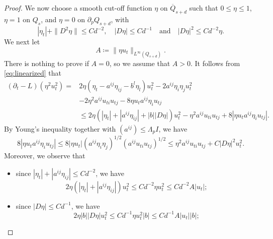 \documentclass[a4paper,11pt]{amsart}
\theoremstyle{plain}
\theoremstyle{definition}
\numberwithin{equation}{section}
\begin{document}
\begin{proof}
We now choose a smooth cut-off function $\eta$ on $\overline{Q}_{s+d}$ such that $0\leq\eta\leq1$, $\eta=1$ on $Q_s$, and $\eta=0$ on $\partial_pQ_{s+d}$, with
\begin{equation*}
    |\eta_t|+\|D^2\eta\|\leq Cd^{-2}, \quad
    |D\eta|\leq Cd^{-1}\quad\text{and}\quad
    |D\eta|^2\leq Cd^{-2}\eta.
\end{equation*}
We next let
\begin{equation*}
 A\coloneqq\|\eta u_t\|_{L^\infty(Q_{s+d})}.
\end{equation*}
There is nothing to prove if $A=0$, so we assume that $A>0$. It follows from \eqref{eq:linearized} that
\begin{equation*}
    \begin{aligned}
        (\partial_t-L)(\eta^2u_t^2)=&2\eta(\eta_t-a^{ij}\eta_{ij}-b^l\eta_l)u_t^2
 -2a^{ij}\eta_i\eta_j u_t^2\\
 &-2\eta^2a^{ij}u_{ti}u_{tj}-8\eta u_ta^{ij}\eta_i u_{tj}\\
 &\leq 2\eta(|\eta_t|+|a^{ij}\eta_{ij}|+|b||D\eta|)u_t^2
 -\eta^2a^{ij}u_{ti}u_{tj}+8|\eta u_ta^{ij}\eta_i u_{tj}|.
    \end{aligned}
\end{equation*}
By Young's inequality together with $(a^{ij}) \leq \Lambda_pI$, we have
\begin{equation*}
 8|\eta u_ta^{ij}\eta_i u_{tj}| \leq 8|\eta u_t|(a^{ij}\eta_i\eta_j)^{1/2}(a^{ij}u_{ti}u_{tj})^{1/2}\leq \eta^2a^{ij}u_{ti}u_{tj}+C|D\eta|^2u_t^2.
\end{equation*}
Moreover, we observe that
\begin{itemize}
    \item since $|\eta_t|+|a^{ij}\eta_{ij}| \leq Cd^{-2}$, we have
    \begin{equation*}
        2\eta(|\eta_t|+|a^{ij}\eta_{ij}|)u_t^2 \leq Cd^{-2} \eta u_t^2 \leq Cd^{-2}A|u_t|;
    \end{equation*}

    \item since $|D\eta| \leq Cd^{-1}$, we have
    \begin{equation*}
        2\eta |b||D\eta|u_t^2 \leq Cd^{-1} \eta u_t^2 |b| \leq Cd^{-1} A |u_t| |b|;
    \end{equation*}


\end{itemize}
\end{proof}
\end{document}
